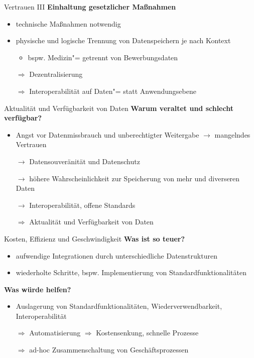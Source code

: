 \begin{frame}{Vertrauen III}
    \textbf{Einhaltung gesetzlicher Maßnahmen}
    \begin{itemize}
        \item technische Maßnahmen notwendig

        \pause
        \item physische und logische Trennung von Datenspeichern je nach Kontext
        \begin{itemize}
            \item bspw. Medizin"= getrennt von Bewerbungsdaten
        \end{itemize}

        \pause
        \item[$\Rightarrow$] Dezentralisierung
        \item[$\Rightarrow$] Interoperabilität auf Daten"= statt Anwendungsebene
    \end{itemize}
\end{frame}


\begin{frame}{Aktualität und Verfügbarkeit von Daten}
    \textbf{Warum veraltet und schlecht verfügbar?}
    \begin{itemize}
        \item Angst vor Datenmissbrauch und unberechtigter Weitergabe $\to$ mangelndes Vertrauen

        \pause
        \item[$\to$] Datensouveränität und Datenschutz
        \item[$\to$] höhere Wahrscheinlichkeit zur Speicherung von mehr und diverseren Daten

        \pause
        \item[$\to$] Interoperabilität, offene Standards

        \pause
        \item[$\Rightarrow$] Aktualität und Verfügbarkeit von Daten
    \end{itemize}
\end{frame}


\begin{frame}{Kosten, Effizienz und Geschwindigkeit}
    \textbf{Was ist so teuer?}
    \begin{itemize}
        \item aufwendige Integrationen durch unterschiedliche Datenstrukturen
        \item wiederholte Schritte, bspw. Implementierung von Standardfunktionalitäten
    \end{itemize}

    \pause
    \textbf{Was würde helfen?}
    \begin{itemize}
        \item Auslagerung von Standardfunktionalitäten, Wiederverwendbarkeit, Interoperabilität
        \item[$\Rightarrow$] Automatisierung $\Rightarrow$ Kostensenkung, schnelle Prozesse
        \item[$\Rightarrow$] ad-hoc Zusammenschaltung von Geschäftsprozessen
    \end{itemize}
\end{frame}


